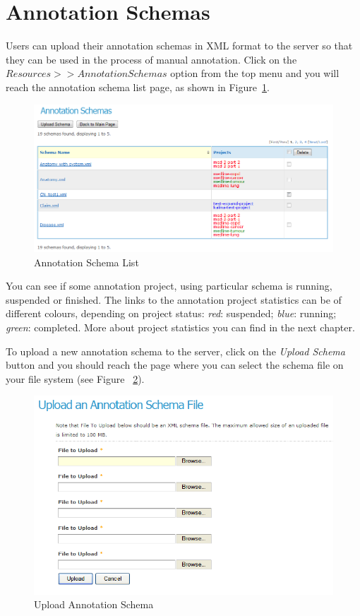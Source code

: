 \section{Annotation Schemas}
Users can upload their annotation schemas in XML format to the server so that 
they can be used in the process of manual annotation. Click on the 
$Resources >> Annotation Schemas$ option from the top menu and you will reach 
the annotation schema list page, as shown in Figure~\ref{fig:annoschemalist}.
\begin{figure}[ht!]
\centering
\includegraphics[scale=0.4]{annoschemalist}
\caption{Annotation Schema List}
\label{fig:annoschemalist}
\end{figure}

You can see if some annotation project, using particular schema is
running, suspended or finished. The links to the annotation
project statistics can be of different colours, depending on project status:
\emph{red}: suspended; \emph{blue}: running; \emph{green}: completed. More about
project statistics you can find in the next chapter.

To upload a new annotation schema to the server, click on the 
\emph{Upload Schema} button and you should reach the page where you can 
select the schema file on your file system (see Figure ~\ref{fig:addschema}).
\begin{figure}[ht!]
\centering
\includegraphics[scale=0.4]{addschema}
\caption{Upload Annotation Schema}
\label{fig:addschema}
\end{figure}

